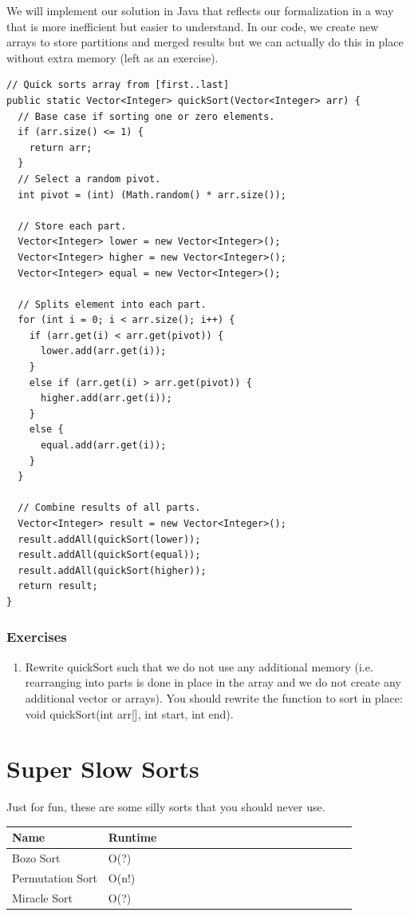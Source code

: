 \documentclass[11pt,oneside]{book}
\begin{document}
We will implement our solution in Java that reflects our formalization in a way that is more inefficient but easier to understand. In our code, we create new arrays to store partitions and merged results but we can actually do this in place without extra memory (left as an exercise).

\begin{lstlisting}
// Quick sorts array from [first..last]
public static Vector<Integer> quickSort(Vector<Integer> arr) {
  // Base case if sorting one or zero elements.
  if (arr.size() <= 1) {
    return arr;
  }
  // Select a random pivot.
  int pivot = (int) (Math.random() * arr.size());

  // Store each part.
  Vector<Integer> lower = new Vector<Integer>();
  Vector<Integer> higher = new Vector<Integer>();
  Vector<Integer> equal = new Vector<Integer>();

  // Splits element into each part.
  for (int i = 0; i < arr.size(); i++) {
    if (arr.get(i) < arr.get(pivot)) {
      lower.add(arr.get(i));
    }
    else if (arr.get(i) > arr.get(pivot)) {
      higher.add(arr.get(i));
    }
    else {
      equal.add(arr.get(i));
    }
  }

  // Combine results of all parts.
  Vector<Integer> result = new Vector<Integer>();
  result.addAll(quickSort(lower));
  result.addAll(quickSort(equal));
  result.addAll(quickSort(higher));
  return result;
}
\end{lstlisting}

\subsection{Exercises}

\begin{enumerate}
\item Rewrite quickSort such that we do not use any additional memory (i.e. rearranging into parts is done in place in the array and we do not create any additional vector or arrays). You should rewrite the function to sort in place: void quickSort(int arr[], int start, int end).
\end{enumerate}

    \chapter{ Super Slow Sorts }
        

Just for fun, these are some silly sorts that you should never use.

\begin{center}\begin{tabulary}{0.4\linewidth}{|l|l|l|l|l|l|l|l|l|l|l|l|l|l|l|l|l|l|l}\hline


  Name &
  Runtime\\
\hline


  Bozo Sort &
  O(?)\\

  Permutation Sort &
  O(n!)\\

  Miracle Sort &
  O(?)\\

\hline\end{tabulary}\end{center}
\end{document}
